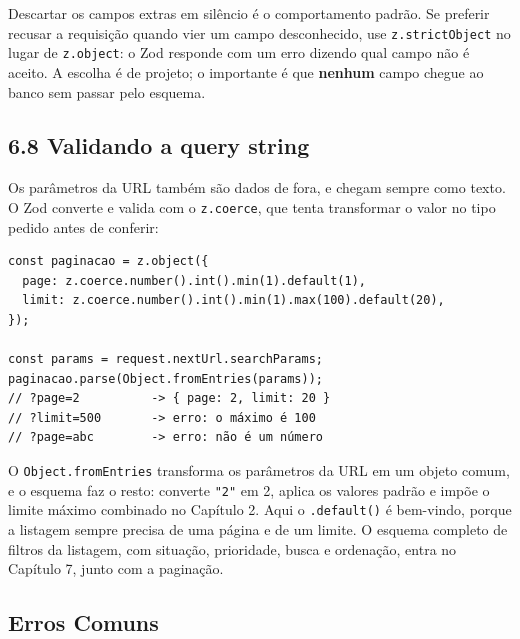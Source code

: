 Descartar os campos extras em silêncio é o comportamento padrão. Se preferir recusar a requisição quando vier um campo desconhecido, use \texttt{z.strictObject} no lugar de \texttt{z.object}: o Zod responde com um erro dizendo qual campo não é aceito. A escolha é de projeto; o importante é que \textbf{nenhum} campo chegue ao banco sem passar pelo esquema.

\subsection{6.8 Validando a query string}

Os parâmetros da URL também são dados de fora, e chegam sempre como texto. O Zod converte e valida com o \texttt{z.coerce}, que tenta transformar o valor no tipo pedido antes de conferir:

\begin{codigo}
\begin{Verbatim}[breaklines=true, breaksymbolleft={}, fontsize=\footnotesize]
const paginacao = z.object({
  page: z.coerce.number().int().min(1).default(1),
  limit: z.coerce.number().int().min(1).max(100).default(20),
});

const params = request.nextUrl.searchParams;
paginacao.parse(Object.fromEntries(params));
// ?page=2          -> { page: 2, limit: 20 }
// ?limit=500       -> erro: o máximo é 100
// ?page=abc        -> erro: não é um número
\end{Verbatim}
\end{codigo}

O \texttt{Object.fromEntries} transforma os parâmetros da URL em um objeto comum, e o esquema faz o resto: converte \texttt{"2"} em 2, aplica os valores padrão e impõe o limite máximo combinado no Capítulo 2. Aqui o \texttt{.default()} é bem-vindo, porque a listagem sempre precisa de uma página e de um limite. O esquema completo de filtros da listagem, com situação, prioridade, busca e ordenação, entra no Capítulo 7, junto com a paginação.

\subsection{Erros Comuns}

